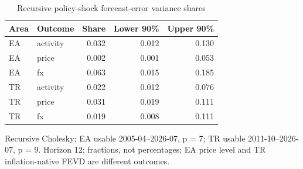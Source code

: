 \begin{table}[htbp]
\centering
\small
\caption{Recursive policy-shock forecast-error variance shares}
\begin{tabularx}{\linewidth}{Xlrrr}
\toprule
Area & Outcome & Share & Lower 90\% & Upper 90\% \\
\midrule
EA & activity & 0.032 & 0.012 & 0.130 \\
EA & price & 0.002 & 0.001 & 0.053 \\
EA & fx & 0.063 & 0.015 & 0.185 \\
TR & activity & 0.022 & 0.012 & 0.076 \\
TR & price & 0.031 & 0.019 & 0.111 \\
TR & fx & 0.019 & 0.008 & 0.111 \\
\bottomrule
\end{tabularx}
\par\vspace{3pt}\begin{minipage}{\linewidth}\footnotesize Recursive Cholesky; EA usable 2005-04–2026-07, p = 7; TR usable 2011-10–2026-07, p = 9.\allowbreak{} Horizon 12; fractions, not percentages; EA price level and TR inflation-native FEVD are different outcomes.\allowbreak{}\end{minipage}
\end{table}
